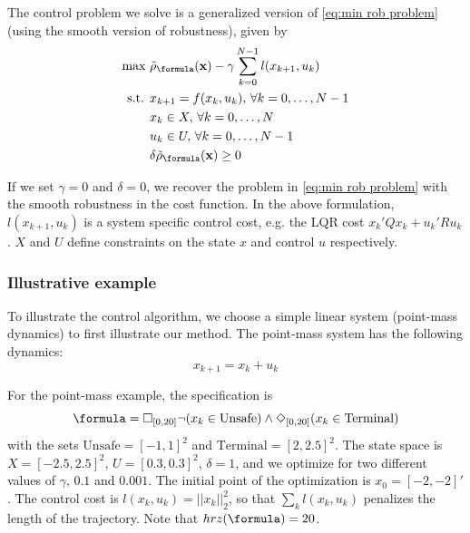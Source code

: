 
The control problem we solve is a generalized version of \eqref{eq:min rob problem} (using the smooth version of robustness), given by
\begin{subequations}
\label{eq:general_ctrl}
\begin{align}
\text{max } & \srob_{\formula}(\sstraj) - \gamma \sum_{k=0}^{N-1} l(x_{k+1},u_{k}) \\
\text{s.t. } & x_{k+1} = f(x_k,u_k), \, \forall k=0,\dotsc,N-1 \\
 & x_k \in X, \, \forall k=0,\dotsc,N \\
 & u_k \in U, \, \forall k=0,\dotsc,N-1 \\
 & \delta \srob_{\formula}(\sstraj) \geq 0
\end{align}
\end{subequations}

If we set $\gamma=0$ and $\delta=0$, we recover the problem in \eqref{eq:min rob problem} with the smooth robustness in the cost function. In the above formulation, $l(x_{k+1},u_{k})$ is a system specific control cost, e.g. the LQR cost $x_k'Qx_k + u_k'Ru_k$. $X$ and $U$ define constraints on the state $x$ and control $u$ respectively. 

\subsubsection{Illustrative example}
\label{sec:illustrative example}
To illustrate the control algorithm, we choose a simple linear system (point-mass dynamics) to first illustrate our method. The point-mass system has the following dynamics:
\begin{equation}
\label{eq:PointMass}
x_{k+1} = x_k + u_k
\end{equation}

For the point-mass example, the specification is 
\[\formula = \always_{[0,20]} \neg (x_k \in \text{Unsafe}) \land \eventually_{[0,20]} (x_k \in \text{Terminal})\]
with the sets $\text{Unsafe}=[-1,1]^2$ and $\text{Terminal}=[2,2.5]^2$. 
The state space is $X=[-2.5,2.5]^2$, $U=[0.3,0.3]^2$, $\delta=1$, and we optimize for two different values of $\gamma$, $0.1$ and $0.001$.
The initial point of the optimization is $x_0=[-2,-2]'$. 
The control cost is $l(x_k,u_k) = ||x_k||_{2}^2$, so that $\sum_kl(x_k,u_k)$ penalizes the length of the trajectory. 
Note that $hrz(\formula) = 20$.

